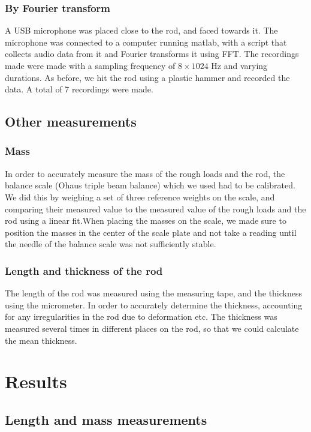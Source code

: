 \documentclass[11pt,a4paper]{article}
\begin{document}
      \subsubsection{By Fourier transform}
        A USB microphone was placed close to the rod, and faced towards it. The microphone was connected to a computer running matlab, with a script that collects audio data from it and Fourier transforms it using FFT. The recordings made were made with a sampling frequency of $8\times1024$ Hz and varying durations. As before, we hit the rod using a plastic hammer and recorded the data. A total of 7 recordings were made.

      \subsection{Other measurements}
        \subsubsection{Mass}
          In order to accurately measure the mass of the rough loads and the rod, the balance scale (Ohaus triple beam balance) which we used had to be calibrated. We did this by weighing a set of three reference weights on the scale, and comparing their measured value to the measured value of the rough loads and the rod using a linear fit.When placing the masses on the scale, we made sure to position the masses in the center of the scale plate and not take a reading until the needle of the balance scale was not sufficiently stable.

        \subsubsection{Length and thickness of the rod}
          The length of the rod was measured using the measuring tape, and the thickness using the micrometer. In order to accurately determine the thickness, accounting for any irregularities in the rod due to deformation etc. The thickness was measured several times in different places on the rod, so that we could calculate the mean thickness.



\section{\label{sect:results}Results}
  
  \subsection{Length and mass measurements}
    
\end{document}
